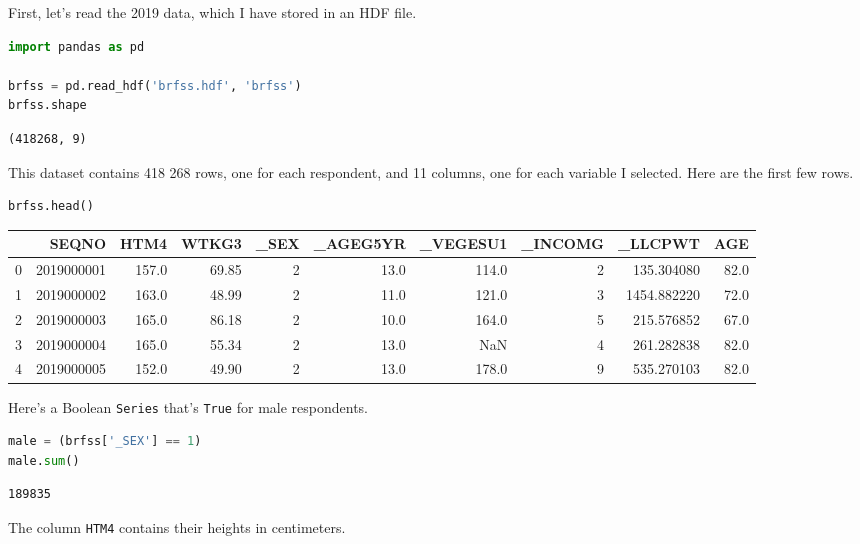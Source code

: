 First, let's read the 2019 data, which I have stored in an HDF file.

\begin{lstlisting}[language=Python,style=source]
import pandas as pd

brfss = pd.read_hdf('brfss.hdf', 'brfss')
brfss.shape
\end{lstlisting}

\begin{lstlisting}[style=output]
(418268, 9)
\end{lstlisting}

This dataset contains 418 268 rows, one for each respondent, and 11
columns, one for each variable I selected. Here are the first few rows.

\begin{lstlisting}[language=Python,style=source]
brfss.head()
\end{lstlisting}

\begin{tabular}{lrrrrrrrrr}
\toprule
{} &       SEQNO &   HTM4 &  WTKG3 &  \_SEX &  \_AGEG5YR &  \_VEGESU1 &  \_INCOMG &      \_LLCPWT &   AGE \\
\midrule
0 &  2019000001 &  157.0 &  69.85 &     2 &      13.0 &     114.0 &        2 &   135.304080 &  82.0 \\
1 &  2019000002 &  163.0 &  48.99 &     2 &      11.0 &     121.0 &        3 &  1454.882220 &  72.0 \\
2 &  2019000003 &  165.0 &  86.18 &     2 &      10.0 &     164.0 &        5 &   215.576852 &  67.0 \\
3 &  2019000004 &  165.0 &  55.34 &     2 &      13.0 &       NaN &        4 &   261.282838 &  82.0 \\
4 &  2019000005 &  152.0 &  49.90 &     2 &      13.0 &     178.0 &        9 &   535.270103 &  82.0 \\
\bottomrule
\end{tabular}

Here's a Boolean \passthrough{\lstinline!Series!} that's
\passthrough{\lstinline!True!} for male respondents.

\begin{lstlisting}[language=Python,style=source]
male = (brfss['_SEX'] == 1)
male.sum()
\end{lstlisting}

\begin{lstlisting}[style=output]
189835
\end{lstlisting}

The column \passthrough{\lstinline!HTM4!} contains their heights in
centimeters.

